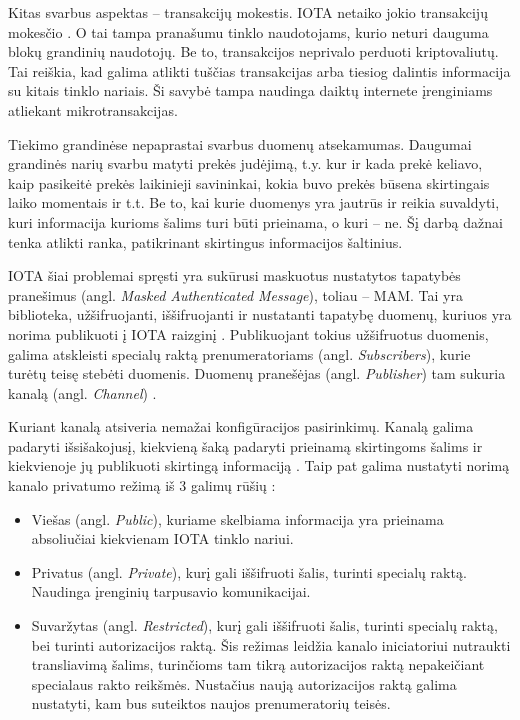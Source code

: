 Kitas svarbus aspektas – transakcijų mokestis. IOTA netaiko jokio transakcijų mokesčio \cite{zivic2019distributed}. O tai tampa pranašumu tinklo naudotojams, kurio neturi dauguma blokų grandinių naudotojų. Be to, transakcijos neprivalo perduoti kriptovaliutų. Tai reiškia, kad galima atlikti tuščias transakcijas arba tiesiog dalintis informacija su kitais tinklo nariais. Ši savybė tampa naudinga daiktų internete įrenginiams atliekant mikrotransakcijas.





Tiekimo grandinėse nepaprastai svarbus duomenų atsekamumas. Daugumai grandinės narių svarbu matyti prekės judėjimą, t.y. kur ir kada prekė keliavo, kaip pasikeitė prekės laikinieji savininkai, kokia buvo prekės būsena skirtingais laiko momentais ir t.t. Be to, kai kurie duomenys yra jautrūs ir reikia suvaldyti, kuri informacija kurioms šalims turi būti prieinama, o kuri – ne. Šį darbą dažnai tenka atlikti ranka, patikrinant skirtingus informacijos šaltinius.

IOTA šiai problemai spręsti yra sukūrusi maskuotus nustatytos tapatybės pranešimus (angl. \textit{Masked Authenticated Message}), toliau – MAM. Tai yra biblioteka, užšifruojanti, iššifruojanti ir nustatanti tapatybę duomenų, kuriuos yra norima publikuoti į IOTA raizginį \cite{andreas2017masked}. Publikuojant tokius užšifruotus duomenis, galima atskleisti specialų raktą prenumeratoriams (angl. \textit{Subscribers}), kurie turėtų teisę stebėti duomenis. Duomenų pranešėjas (angl. \textit{Publisher}) tam sukuria kanalą (angl. \textit{Channel}) \cite{ab2018iota}.

Kuriant kanalą atsiveria nemažai konfigūracijos pasirinkimų. Kanalą galima padaryti išsišakojusį, kiekvieną šaką padaryti prieinamą skirtingoms šalims ir kiekvienoje jų publikuoti skirtingą informaciją \cite{ab2018iota}. Taip pat galima nustatyti norimą kanalo privatumo režimą iš 3 galimų rūšių \cite{paul2017introducing}:
\begin{itemize}
    \item Viešas (angl. \textit{Public}), kuriame skelbiama informacija yra prieinama absoliučiai kiekvienam IOTA tinklo nariui.
    \item Privatus (angl. \textit{Private}), kurį gali iššifruoti šalis, turinti specialų raktą. Naudinga įrenginių tarpusavio komunikacijai.
    \item Suvaržytas (angl. \textit{Restricted}), kurį gali iššifruoti šalis, turinti specialų raktą, bei turinti autorizacijos raktą. Šis režimas leidžia kanalo iniciatoriui nutraukti transliavimą šalims, turinčioms tam tikrą autorizacijos raktą nepakeičiant specialaus rakto reikšmės. Nustačius naują autorizacijos raktą galima nustatyti, kam bus suteiktos naujos prenumeratorių teisės.
\end{itemize}

